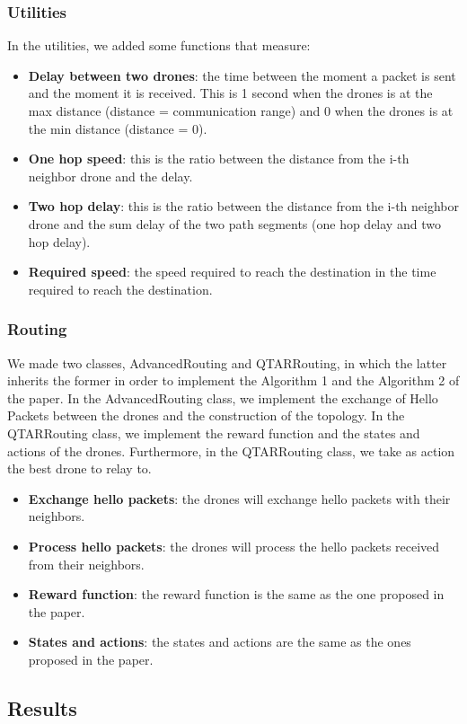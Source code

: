 \subsubsection{Utilities}
In the utilities, we added some functions that measure:
\begin{itemize}
    \item \textbf{Delay between two drones}: the time between the moment a packet is sent and the moment it is received. This is 1 second when the drones is at the max distance (distance = communication range) and 0 when the drones is at the min distance (distance = 0).
    \item \textbf{One hop speed}: this is the ratio between the distance from the i-th neighbor drone and the delay.
    \item \textbf{Two hop delay}: this is the ratio between the distance from the i-th neighbor drone and the sum delay of the two path segments (one hop delay and two hop delay).
    \item \textbf{Required speed}: the speed required to reach the destination in the time required to reach the destination.
\end{itemize}


\subsubsection{Routing}
We made two classes, AdvancedRouting and QTARRouting, in which the latter inherits the former in order to implement the Algorithm 1 and the Algorithm 2 of the paper.
In the AdvancedRouting class, we implement the exchange of Hello Packets between the drones and the construction of the topology.
In the QTARRouting class, we implement the reward function and the states and actions of the drones.
Furthermore, in the QTARRouting class, we take as action the best drone to relay to.

\begin{itemize}
    \item \textbf{Exchange hello packets}: the drones will exchange hello packets with their neighbors.
    \item \textbf{Process hello packets}: the drones will process the hello packets received from their neighbors.
    \item \textbf{Reward function}: the reward function is the same as the one proposed in the paper.
    \item \textbf{States and actions}: the states and actions are the same as the ones proposed in the paper.
\end{itemize}



\subsection{Results}

